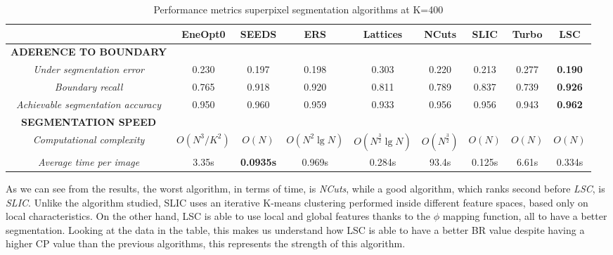 \begin{table}[h!]
    \centering
    \begin{adjustbox}{max width=\textwidth}
    \begin{tabular}{*{9}{|c}|}%
        \hline
        & EneOpt0 & SEEDS & ERS & Lattices & NCuts & SLIC & Turbo & LSC \\
        \hline
        \bfseries{ADERENCE TO BOUNDARY} & & & & & & & & \\
        \emph{Under segmentation error} & 0.230 & 0.197 & 0.198 & 0.303 & 0.220 & 0.213 & 0.277 & \bfseries{0.190}\\
        \emph{Boundary recall} & 0.765 & 0.918 & 0.920 & 0.811 & 0.789 & 0.837 & 0.739 & \bfseries{0.926}\\
        \emph{Achievable segmentation accuracy} & 0.950 & 0.960 & 0.959 & 0.933 & 0.956 & 0.956 & 0.943 & \bfseries{0.962}\\
        \hline
        \bfseries{SEGMENTATION SPEED} & & & & & & & & \\
        \emph{Computational complexity} & $ O(N^3/K^2) $ & $ O(N) $ & $ O(N^2 \lg{N}) $ & $ O(N^{\frac{3}{2}} \lg{N}) $ & $ O(N^{\frac{3}{2}}) $ & $ O(N) $ & $ O(N) $ & $ O(N) $\\
        \emph{Average time per image} & 3.35s & \bfseries{0.0935}s & 0.969s & 0.284s & 93.4s & 0.125s & 6.61s & 0.334s\\
        \hline
    \end{tabular}
    \end{adjustbox}
    \caption{Performance metrics superpixel segmentation algorithms at K=400}
    \label{table superpixels}
\end{table}
As we can see from the results, the worst algorithm, in terms of time, 
is \emph{NCuts}, while a good algorithm, which ranks second before \emph{LSC}, is \emph{SLIC}. 
Unlike the algorithm studied, SLIC uses an iterative K-means clustering 
performed inside different feature spaces, based only on local characteristics. 
On the other hand, LSC is able to use local and global features thanks to the 
$ \phi $  mapping function, all to have a better segmentation. Looking at the data 
in the table, this makes us understand how LSC is able to have a better BR 
value despite having a higher CP value than the previous algorithms, this 
represents the strength of this algorithm.